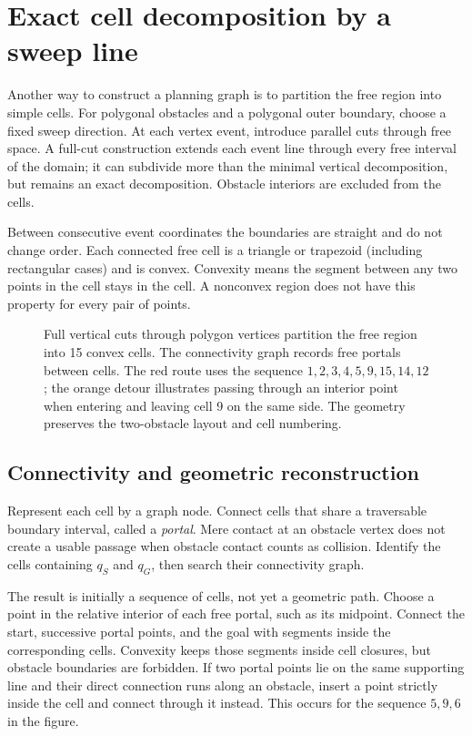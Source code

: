 \section{Exact cell decomposition by a sweep line}
\label{sec:l13-sweep}
Another way to construct a planning graph is to partition the free region
into simple cells. For polygonal obstacles and a polygonal outer boundary,
choose a fixed sweep direction. At each vertex event, introduce parallel
cuts through free space. A full-cut construction extends each event line
through every free interval of the domain; it can subdivide more than
the minimal vertical decomposition, but remains an exact decomposition.
Obstacle interiors are excluded from the cells.

Between consecutive event coordinates the boundaries are straight and
do not change order. Each connected free cell is a triangle or trapezoid
(including rectangular cases) and is convex. Convexity means the segment
between any two points in the cell stays in the cell. A nonconvex region
does not have this property for every pair of points.

\begin{figure}[htbp]
\centering
\caption{Full vertical cuts through polygon vertices partition the free
region into 15 convex cells. The connectivity graph records free portals
between cells. The red route uses the sequence
$1,2,3,4,5,9,15,14,12$; the orange detour illustrates passing through an
interior point when entering and leaving cell 9 on the same side.
The geometry preserves the two-obstacle layout and cell numbering.}
\label{fig:l13-cells}
\end{figure}

\subsection{Connectivity and geometric reconstruction}
Represent each cell by a graph node. Connect cells that share a
traversable boundary interval, called a \emph{portal}. Mere contact at
an obstacle vertex does not create a usable passage when obstacle contact
counts as collision. Identify the cells containing $q_S$ and $q_G$, then
search their connectivity graph.

The result is initially a sequence of cells, not yet a geometric path.
Choose a point in the relative interior of each free portal, such as its
midpoint. Connect the start, successive portal points, and the goal with
segments inside the corresponding cells. Convexity keeps those segments
inside cell closures, but obstacle boundaries are forbidden. If two portal
points lie on the same supporting line and their direct connection runs
along an obstacle, insert a point strictly inside the cell and connect
through it instead. This occurs for the sequence $5,9,6$ in the figure.

